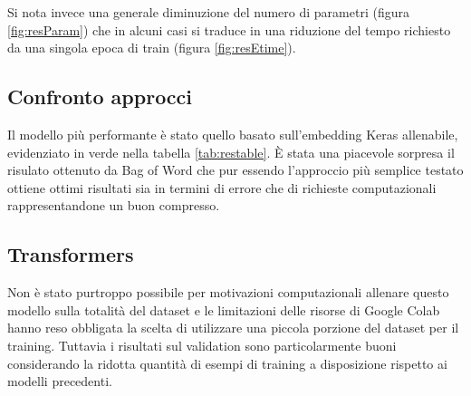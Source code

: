 Si nota invece una generale diminuzione del numero di parametri (figura
\ref{fig:resParam}) che in alcuni casi si traduce in una riduzione del tempo
richiesto da una singola epoca di train (figura \ref{fig:resEtime}).


\subsection{Confronto approcci}
Il modello più performante è stato quello basato sull'embedding Keras
allenabile, evidenziato in verde nella tabella \ref{tab:restable}.
È stata una piacevole sorpresa il risulato ottenuto da Bag of Word che pur
essendo l'approccio più semplice testato ottiene ottimi risultati sia in termini
di errore che di richieste computazionali rappresentandone un buon compresso.

\subsection{Transformers}

Non è stato purtroppo possibile per motivazioni computazionali allenare questo
modello sulla totalità del dataset e le limitazioni delle risorse di Google
Colab hanno reso obbligata la scelta di utilizzare una piccola porzione del
dataset per il training. Tuttavia i risultati sul validation sono
particolarmente buoni considerando la ridotta quantità di esempi di training a
disposizione rispetto ai modelli precedenti.